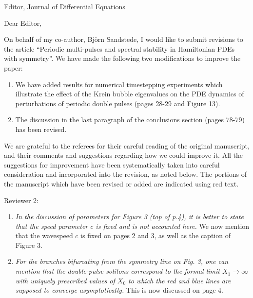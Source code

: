 \documentclass[11pt]{letter}
\begin{document}
\address{Ross Parker \\
Department of Mathematics \\
Southern Methodist University \\
Dallas, TX 75275 \\
\texttt{rhparker@smu.edu}}%
\signature{Ross Parker}
\begin{letter}{Editor, Journal of Differential Equations}

\opening{Dear Editor,}

On behalf of my co-author, Bj\"orn Sandstede, I would like to submit revisions to the article ``Periodic multi-pulses and spectral stability in Hamiltonian PDEs with symmetry''. We have made the following two modifications to improve the paper:
\begin{enumerate}
    \item We have added results for numerical timestepping experiments which illustrate the effect of the Krein bubble eigenvalues on the PDE dynamics of perturbations of periodic double pulses (pages 28-29 and Figure 13).
    \item The discussion in the last paragraph of the conclusions section (pages 78-79) has been revised.
\end{enumerate}

We are grateful to the referees for their careful reading of the original manuscript, and their comments and suggestions regarding how we could improve it. All the suggestions for improvement have been systematically taken into careful consideration and incorporated into the revision, as noted below. The portions of the manuscript which have been revised or added are indicated using red text.

Reviewer 2:
\begin{enumerate}
    \item \emph{In the discussion of parameters for Figure 3 (top of p.4), it is better to state that the speed parameter $c$ is fixed and is not accounted here.} We now mention that the wavespeed $c$ is fixed on pages 2 and 3, as well as the caption of Figure 3.
    \vspace{4mm}

    \item \emph{For the branches bifurcating from the symmetry line on Fig. 3, one can mention that the double-pulse solitons correspond to the formal limit $X_1 \rightarrow \infty$ with uniquely prescribed values of $X_0$ to which the red and blue lines are supposed to converge asymptotically.} This is now discussed on page 4.
    \vspace{4mm}


\end{enumerate}
\end{letter}
\end{document}

